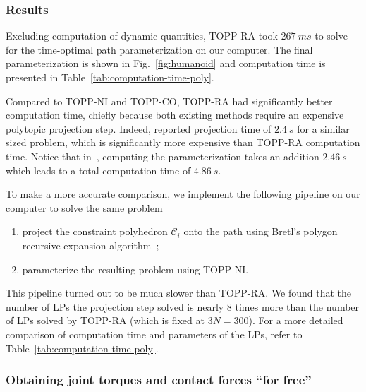 \documentclass[journal]{IEEEtran}
\theoremstyle{plain}
\theoremstyle{definition}
\theoremstyle{definition}
\newcommand{\cC}{\mathscr{C}}
\begin{document}
\subsubsection{Results}

Excluding computation of dynamic quantities, TOPP-RA took
$\SI{267}{ms}$ to solve for the time-optimal path parameterization on
our computer.  The final parameterization is shown in
Fig.~\ref{fig:humanoid} and computation time is presented in
Table~\ref{tab:computation-time-poly}.

Compared to TOPP-NI and TOPP-CO, TOPP-RA had significantly better
computation time, chiefly because both existing methods require an
expensive polytopic projection step.  Indeed, \cite{hauser2014}
reported projection time of $\SI{2.4}{s}$ for a similar sized problem,
which is significantly more expensive than TOPP-RA computation
time. Notice that in~\cite{hauser2014}, computing the parameterization
takes an addition $\SI{2.46}{s}$ which leads to a total computation time
of $\SI{4.86}{s}$.

To make a more accurate comparison, we implement the following
pipeline on our computer to solve the same problem~\cite{pham2015time}
\begin{enumerate}
\item project the constraint polyhedron $\cC_i$ onto the path using
  Bretl's polygon recursive expansion algorithm~\cite{bretl2008tro};
\item parameterize the resulting problem using TOPP-NI.
\end{enumerate}
This pipeline turned out to be much slower than TOPP-RA\@.  We found
that the number of LPs the projection step solved is nearly 8 times
more than the number of LPs solved by TOPP-RA (which is fixed at
$3N = 300$).  For a more detailed comparison of computation time and
parameters of the LPs, refer to Table~\ref{tab:computation-time-poly}.

\subsubsection{Obtaining joint torques and contact forces ``for free''}
\label{sec:obta-joint-torq}
\end{document}
